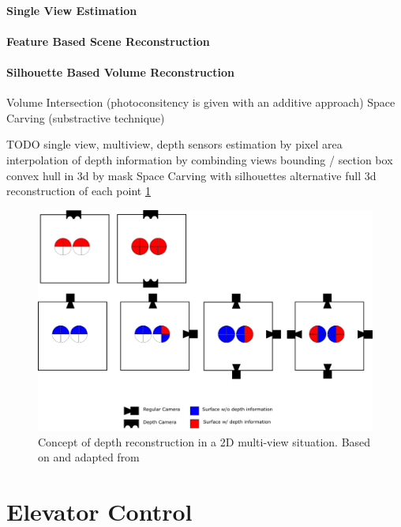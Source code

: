 \paragraph{Single View Estimation}

\paragraph{Feature Based Scene Reconstruction} 

\paragraph{Silhouette Based Volume Reconstruction}
Volume Intersection (photoconsitency is given with an additive approach)
\autocite[][]{}
Space Carving (substractive technique)
\autocite[][]{kutulakos1999spacecarving}

TODO
single view, multiview, depth sensors
estimation by pixel area
interpolation of depth information by combinding views
bounding / section box
convex hull in 3d by mask
Space Carving with silhouettes
alternative full 3d reconstruction of each point
\ref{fig:sota:mulitviewtop}

\begin{figure}[hbt]
	\centering
	\includegraphics[width=1.0\textwidth, keepaspectratio]{resources/multiview}
	\caption{\label{fig:sota:mulitviewtop}Concept of depth reconstruction in a 2D multi-view situation.
	Based on and adapted from \textcite[][]{sonaten2011volume}}
\end{figure}


\section{Elevator Control}

